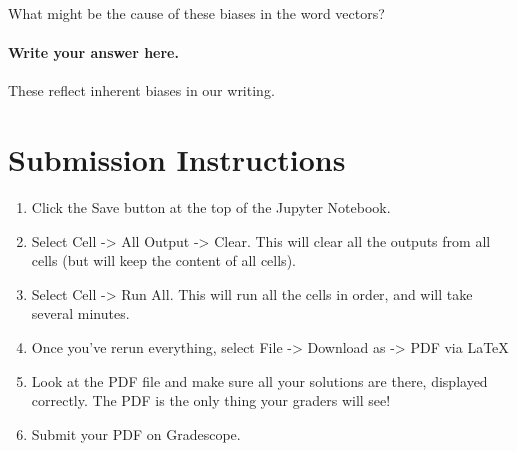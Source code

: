 \documentclass[11pt]{article}
\providecommand{\tightlist}{%
      \setlength{\itemsep}{0pt}\setlength{\parskip}{0pt}}
\begin{document}
What might be the cause of these biases in the word vectors?

    \paragraph{Write your answer here.}\label{write-your-answer-here.}

These reflect inherent biases in our writing.

    \section{ Submission Instructions}\label{submission-instructions}

\begin{enumerate}
\def\labelenumi{\arabic{enumi}.}
\tightlist
\item
  Click the Save button at the top of the Jupyter Notebook.
\item
  Select Cell -\textgreater{} All Output -\textgreater{} Clear. This
  will clear all the outputs from all cells (but will keep the content
  of all cells).
\item
  Select Cell -\textgreater{} Run All. This will run all the cells in
  order, and will take several minutes.
\item
  Once you've rerun everything, select File -\textgreater{} Download as
  -\textgreater{} PDF via LaTeX
\item
  Look at the PDF file and make sure all your solutions are there,
  displayed correctly. The PDF is the only thing your graders will see!
\item
  Submit your PDF on Gradescope.
\end{enumerate}


    
    
    
    
\end{document}
